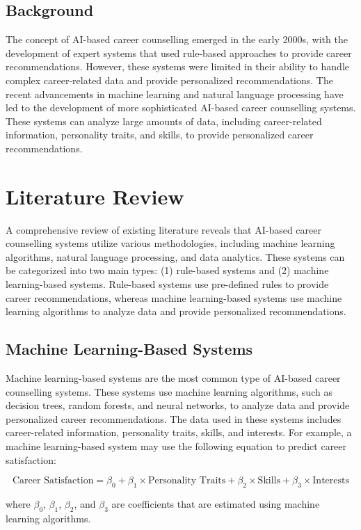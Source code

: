 \documentclass[12pt,a4paper]{article}
\begin{document}
\subsection{Background}
The concept of AI-based career counselling emerged in the early 2000s, with the development of expert systems that used rule-based approaches to provide career recommendations. However, these systems were limited in their ability to handle complex career-related data and provide personalized recommendations. The recent advancements in machine learning and natural language processing have led to the development of more sophisticated AI-based career counselling systems. These systems can analyze large amounts of data, including career-related information, personality traits, and skills, to provide personalized career recommendations.

\section{Literature Review}
A comprehensive review of existing literature reveals that AI-based career counselling systems utilize various methodologies, including machine learning algorithms, natural language processing, and data analytics. These systems can be categorized into two main types: (1) rule-based systems and (2) machine learning-based systems. Rule-based systems use pre-defined rules to provide career recommendations, whereas machine learning-based systems use machine learning algorithms to analyze data and provide personalized recommendations.

\subsection{Machine Learning-Based Systems}
Machine learning-based systems are the most common type of AI-based career counselling systems. These systems use machine learning algorithms, such as decision trees, random forests, and neural networks, to analyze data and provide personalized career recommendations. The data used in these systems includes career-related information, personality traits, skills, and interests. For example, a machine learning-based system may use the following equation to predict career satisfaction:

$$
\text{Career Satisfaction} = \beta_0 + \beta_1 \times \text{Personality Traits} + \beta_2 \times \text{Skills} + \beta_3 \times \text{Interests}
$$

where $\beta_0$, $\beta_1$, $\beta_2$, and $\beta_3$ are coefficients that are estimated using machine learning algorithms.
\end{document}
